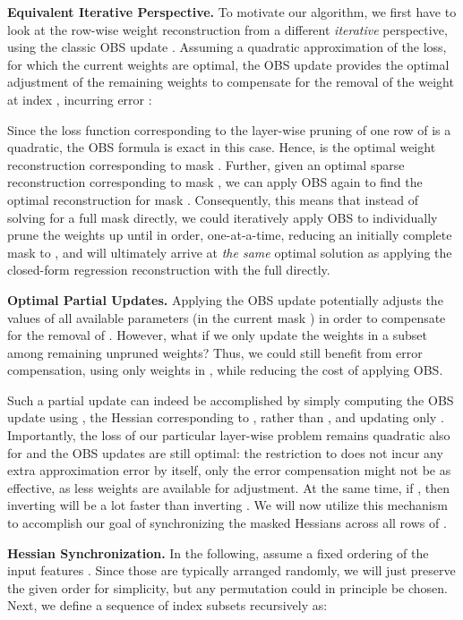 \documentclass{article}
\theoremstyle{plain}
\theoremstyle{definition}
\theoremstyle{remark}
\renewcommand{\paragraph}[1]{\vspace{-0.1em} \noindent \textbf{#1}}
\begin{document}
\paragraph{Equivalent Iterative Perspective.} To motivate our algorithm, we first have to look at the row-wise weight reconstruction from a different \emph{iterative} perspective, using the classic OBS update \cite{hassibi1993optimal, singh2020woodfisher, frantar2021m}. Assuming a quadratic approximation of the loss, for which the current weights  are optimal, the OBS update  provides the optimal adjustment of the remaining weights to compensate for the removal of the weight at index , incurring error :

Since the loss function corresponding to the layer-wise pruning of one row of  is a quadratic, the OBS formula is exact in this case. Hence,  is the optimal weight reconstruction corresponding to mask . Further, given an optimal sparse reconstruction  corresponding to mask , we can apply OBS again to find the optimal reconstruction for mask . Consequently, this means that instead of solving for a full mask  directly, we could iteratively apply OBS to individually prune the weights  up until  in order, one-at-a-time, reducing an initially complete mask to , and will ultimately arrive at \emph{the same} optimal solution as applying the closed-form regression reconstruction with the full  directly. 

\textbf{Optimal Partial Updates.} Applying the OBS update  potentially adjusts the values of all available parameters (in the current mask ) in order to compensate for the removal of . However, what if we only update the weights in a subset  among remaining unpruned weights? Thus, we could still benefit from error compensation, using only weights in , while reducing the cost of applying OBS.

Such a partial update can indeed be accomplished by simply computing the OBS update using , the Hessian corresponding to , rather than , and updating only . Importantly, the loss of our particular layer-wise problem remains quadratic also for  and the OBS updates are still optimal: the restriction to  does not incur any extra approximation error by itself, only the error compensation might not be as effective, as less weights are available for adjustment. At the same time, if , then inverting  will be a lot faster than inverting . We will now utilize this mechanism to accomplish our goal of synchronizing the masked Hessians across all rows of .

\textbf{Hessian Synchronization.} In the following, assume a fixed ordering of the input features . Since those are typically arranged randomly, we will just preserve the given order for simplicity, but any permutation could in principle be chosen. Next, we define a sequence of  index subsets  recursively as:
\end{document}
